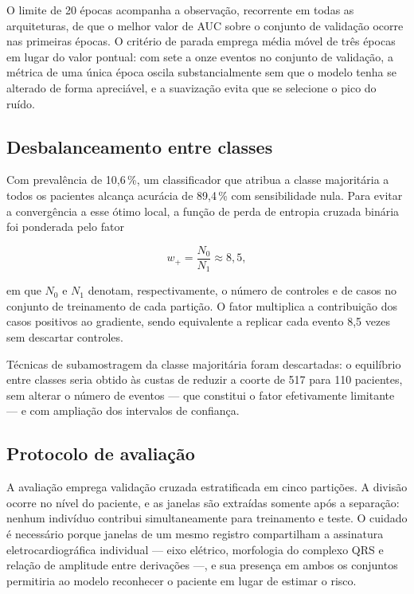 O limite de 20 épocas acompanha a observação, recorrente em todas as
arquiteturas, de que o melhor valor de \gls{AUC} sobre o conjunto de
validação ocorre nas primeiras épocas. O critério de parada emprega média
móvel de três épocas em lugar do valor pontual: com sete a onze eventos no
conjunto de validação, a métrica de uma única época oscila substancialmente
sem que o modelo tenha se alterado de forma apreciável, e a suavização evita
que se selecione o pico do ruído.

\subsection{Desbalanceamento entre classes}
\label{subsec:config-desbalanceamento}

Com prevalência de 10,6\,\%, um classificador que atribua a classe
majoritária a todos os pacientes alcança acurácia de 89,4\,\% com
sensibilidade nula. Para evitar a convergência a esse ótimo local, a função
de perda de entropia cruzada binária foi ponderada pelo fator

\begin{equation}
	w_{+} = \frac{N_0}{N_1} \approx 8{,}5,
	\label{eq:pos-weight}
\end{equation}

\noindent
em que $N_0$ e $N_1$ denotam, respectivamente, o número de controles e de
casos no conjunto de treinamento de cada partição. O fator multiplica a
contribuição dos casos positivos ao gradiente, sendo equivalente a replicar
cada evento 8,5 vezes sem descartar controles.

Técnicas de subamostragem da classe majoritária foram descartadas: o
equilíbrio entre classes seria obtido às custas de reduzir a coorte de 517
para 110 pacientes, sem alterar o número de eventos --- que constitui o
fator efetivamente limitante --- e com ampliação dos intervalos de confiança.

\subsection{Protocolo de avaliação}
\label{subsec:config-avaliacao}

A avaliação emprega validação cruzada estratificada em cinco partições. A
divisão ocorre no nível do paciente, e as janelas são extraídas somente após
a separação: nenhum indivíduo contribui simultaneamente para treinamento e
teste. O cuidado é necessário porque janelas de um mesmo registro
compartilham a assinatura eletrocardiográfica individual --- eixo elétrico,
morfologia do complexo QRS e relação de amplitude entre derivações ---, e sua
presença em ambos os conjuntos permitiria ao modelo reconhecer o paciente em
lugar de estimar o risco.

